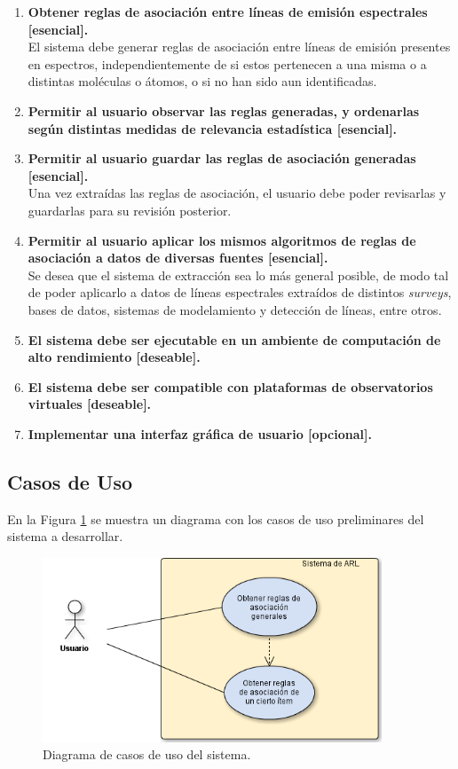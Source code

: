 \begin{enumerate}
	\item \textbf{Obtener reglas de asociación entre líneas de emisión espectrales [esencial].} \\
	El sistema debe generar reglas de asociación entre líneas de emisión presentes en espectros, independientemente de si estos pertenecen a una misma o a distintas moléculas o átomos, o si no han sido aun identificadas.
	\item \textbf{Permitir al usuario observar las reglas generadas, y ordenarlas según distintas medidas de relevancia estadística [esencial].} \\
	\item \textbf{Permitir al usuario guardar las reglas de asociación generadas [esencial].} \\
	Una vez extraídas las reglas de asociación, el usuario debe poder revisarlas y guardarlas para su revisión posterior.
	\item \textbf{Permitir al usuario aplicar los mismos algoritmos de reglas de asociación a datos de diversas fuentes [esencial].} \\
	Se desea que el sistema de extracción sea lo más general posible, de modo tal de poder aplicarlo a datos de líneas espectrales extraídos de distintos \textit{surveys}, bases de datos, sistemas de modelamiento y detección de líneas, entre otros.
	\item \textbf{El sistema debe ser ejecutable en un ambiente de computación de alto rendimiento [deseable].}
	\item \textbf{El sistema debe ser compatible con plataformas de observatorios virtuales [deseable].} 
	\item \textbf{Implementar una interfaz gráfica de usuario [opcional].}
\end{enumerate}

\subsection{Casos de Uso}

En la Figura \ref{fig:cases} se muestra un diagrama con los casos de uso preliminares del sistema a desarrollar.

\begin{figure}[h!]
\begin{center}
\includegraphics[width=0.9\textwidth]{imagenes/casos_de_uso.png}
\end{center}
\vspace*{-5mm}
\caption{Diagrama de casos de uso del sistema.}
\label{fig:cases}
\end{figure}

